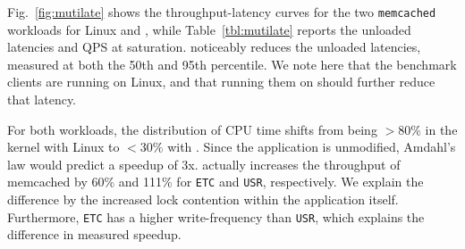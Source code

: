 


 Fig.~\ref{fig:mutilate} shows the throughput-latency curves for the
two \texttt{memcached} workloads for Linux and \ix, while
Table~\ref{tbl:mutilate} reports the unloaded latencies and QPS at
saturation.  \ix noticeably reduces the unloaded latencies, measured
at both the 50th and 95th percentile.  We note here that the benchmark
clients are running on Linux, and that running them on \ix should
further reduce that latency. 

For both workloads, the distribution of CPU time shifts from being
$>80\%$ in the kernel with Linux to $<30\%$ with \ix.  Since the
application is unmodified, Amdahl's law would predict a speedup of 3x.
\ix actually increases the throughput of memcached by 60\% and 111\%
for \texttt{ETC} and \texttt{USR}, respectively.  We explain the
difference by the increased lock contention within the application
itself.  Furthermore, \texttt{ETC} has a higher write-frequency than
\texttt{USR}, which explains the difference in measured speedup.  


%
